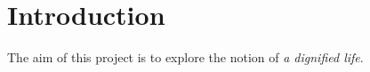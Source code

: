\section{Introduction}

The aim of this project is to explore the notion of \textit{a dignified life}.

